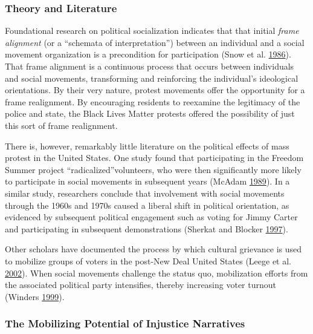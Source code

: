 \documentclass[
  12pt,
]{article}
\begin{document}
\hypertarget{theory-and-literature}{%
\subsubsection*{Theory and Literature}\label{theory-and-literature}}

Foundational research on political socialization indicates that that initial \emph{frame alignment} (or a ``schemata of interpretation'') between an individual and a social movement organization is a precondition for participation (Snow et al. \protect\hyperlink{ref-Snow1986}{1986}). That frame alignment is a continuous process that occurs between individuals and social movements, transforming and reinforcing the individual's ideological orientations. By their very nature, protest movements offer the opportunity for a frame realignment. By encouraging residents to reexamine the legitimacy of the police and state, the Black Lives Matter protests offered the possibility of just this sort of frame realignment.

There is, however, remarkably little literature on the political effects of mass protest in the United States. One study found that participating in the Freedom Summer project ``radicalized''volunteers, who were then significantly more likely to participate in social movements in subsequent years (McAdam \protect\hyperlink{ref-McAdam1989}{1989}). In a similar study, researchers conclude that involvement with social movements through the 1960s and 1970s caused a liberal shift in political orientation, as evidenced by subsequent political engagement such as voting for Jimmy Carter and participating in subsequent demonstrations (Sherkat and Blocker \protect\hyperlink{ref-Sherkat1997}{1997}).

Other scholars have documented the process by which cultural grievance is used to mobilize groups of voters in the post-New Deal United States (Leege et al. \protect\hyperlink{ref-Leege2002}{2002}). When social movements challenge the status quo, mobilization efforts from the associated political party intensifies, thereby increasing voter turnout (Winders \protect\hyperlink{ref-Winders1999}{1999}).

\hypertarget{the-mobilizing-potential-of-injustice-narratives}{%
\subsubsection*{The Mobilizing Potential of Injustice Narratives}\label{the-mobilizing-potential-of-injustice-narratives}}
\end{document}

